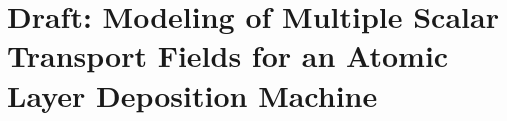 \chapter{Draft: Modeling of Multiple Scalar Transport Fields for an Atomic Layer Deposition Machine}
\label{sec:modeling_of_multiple_scalar_transport_fields_for_an_atomic_layer_deposition_machine}






% 








